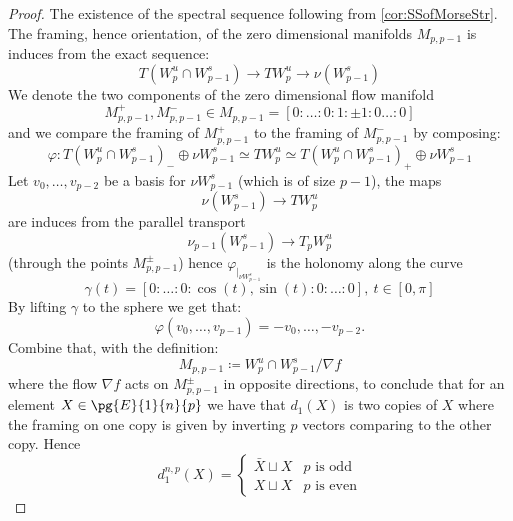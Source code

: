 \begin{proof}
    The existence of the spectral sequence following from \cref{cor:SSofMorseStr}.
    The framing, hence orientation, of the zero dimensional manifolds $M_{p,p-1}$ is induces from the exact sequence:
    \begin{equation*}
        T(W_p^u \cap W_{p-1}^s) \to TW_p^u \to \nu(W^s_{p-1})
    \end{equation*}
    We denote the two components of the zero dimensional flow manifold
    \begin{equation*}
        M_{p,p-1}^+,M_{p,p-1}^- \in M_{p,p-1}=[0:\dots:0:1:\pm 1:0\dots:0]
    \end{equation*}
    and we compare the framing of $M_{p,p-1}^+$ to the framing of $M_{p,p-1}^-$ by composing:
    \begin{equation*}
        \varphi:T(W_p^u \cap W_{p-1}^s)_- \oplus \nu W^s_{p-1} \simeq TW_p^u \simeq T(W_p^u \cap W_{p-1}^s)_+ \oplus \nu W^s_{p-1}
    \end{equation*}
    Let $v_0,\dots, v_{p-2}$ be a basis for $\nu W^s_{p-1}$ (which is of size $p-1$), the maps
    \begin{equation*}
        \nu(W^s_{p-1}) \to  TW_p^u
    \end{equation*}
    are induces from the parallel transport
    \begin{equation*}
        \nu_{p-1} (W^s_{p-1}) \to  T_p W_p^u
    \end{equation*}
    (through the points $M_{p,p-1}^{\pm}$) hence $\varphi_{\mid_{\nu W^s_{p-1}}}$ is the holonomy along the curve 
    \begin{equation*}
        \gamma(t) = [0:\dots:0:\cos(t),\sin(t):0:\dots:0],\ t \in [0,\pi]
    \end{equation*}
    By lifting $\gamma$ to the sphere we get that:
    \begin{equation*}
        \varphi(v_0,\dots, v_{p-1}) = -v_0,\dots, -v_{p-2}.
    \end{equation*}
    Combine that, with the definition:
    \begin{equation*}
        M_{p,p-1} \coloneqq W^u_p \cap W^s_{p-1} / \nabla f
    \end{equation*}
    where the flow $\nabla f$ acts on $M_{p,p-1}^{\pm}$ in opposite directions, to conclude that for an element $X \in \pg{E}{1}{n}{p}$ we have that $d_1(X)$ is two copies of $X$ where the framing on one copy is given by inverting $p$ vectors comparing to the other copy. Hence
    \begin{equation*}
        d_1^{n,p}(X) = \begin{cases}
            \bar{X} \sqcup X & \text{$p$ is odd} \\
            X \sqcup X & \text{$p$ is even} 
        \end{cases}
    \end{equation*}


\end{proof}
